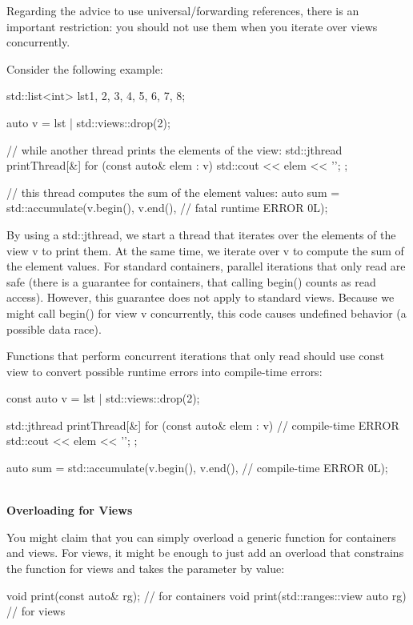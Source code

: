 Regarding the advice to use universal/forwarding references, there is an important restriction: you should not use them when you iterate over views concurrently.

Consider the following example:

\begin{cpp}
std::list<int> lst{1, 2, 3, 4, 5, 6, 7, 8};

auto v = lst | std::views::drop(2);

// while another thread prints the elements of the view:
std::jthread printThread{[&] {
		for (const auto& elem : v) {
			std::cout << elem << '\n';
		}
}};

// this thread computes the sum of the element values:
auto sum = std::accumulate(v.begin(), v.end(), // fatal runtime ERROR
0L);
\end{cpp}

By using a std::jthread, we start a thread that iterates over the elements of the view v to print them. At the same time, we iterate over v to compute the sum of the element values. For standard containers, parallel iterations that only read are safe (there is a guarantee for containers, that calling begin() counts as read access). However, this guarantee does not apply to standard views. Because we might call begin() for view v concurrently, this code causes undefined behavior (a possible data race).

Functions that perform concurrent iterations that only read should use const view to convert possible runtime errors into compile-time errors:

\begin{cpp}
const auto v = lst | std::views::drop(2);

std::jthread printThread{[&] {
		for (const auto& elem : v) { // compile-time ERROR
			std::cout << elem << '\n';
		}
}};

auto sum = std::accumulate(v.begin(), v.end(), // compile-time ERROR
0L);
\end{cpp}

\noindent
\hspace*{\fill} \\ %
\textbf{Overloading for Views}

You might claim that you can simply overload a generic function for containers and views. For views, it might be enough to just add an overload that constrains the function for views and takes the parameter by value:

\begin{cpp}
void print(const auto& rg); // for containers
void print(std::ranges::view auto rg) // for views
\end{cpp}

